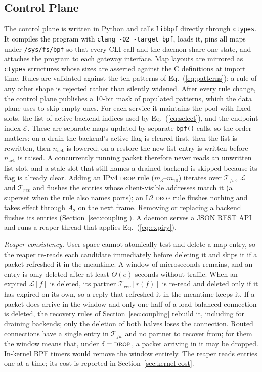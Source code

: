 \documentclass[conference]{IEEEtran}
\begin{document}
\subsection{Control Plane}
The control plane is written in Python and calls \texttt{libbpf} directly
through \texttt{ctypes}. It compiles the program with
\texttt{clang -O2 -target bpf}, loads it, pins all maps under
\texttt{/sys/fs/bpf} so that every CLI call and the daemon share one state,
and attaches the program to each gateway interface. Map layouts are mirrored as
\texttt{ctypes} structures whose sizes are asserted against the C definitions
at import time. Rules are validated against the ten patterns of
Eq.~(\ref{eq:patterns}); a rule of any other shape is rejected rather than
silently widened. After every rule change, the control plane publishes a
10-bit mask of populated patterns, which the data plane uses to skip empty
ones. For each service it maintains the pool with fixed slots, the list of active
backend indices used by Eq.~(\ref{eq:select}), and the endpoint index
$\mathcal{E}$. These are separate maps updated by separate \texttt{bpf()}
calls, so the order matters: on a drain the backend's active flag is cleared
first, then the list is rewritten, then $n_{\mathrm{act}}$ is lowered; on a
restore the new list entry is written before $n_{\mathrm{act}}$ is raised. A
concurrently running packet therefore never reads an unwritten list slot, and
a stale slot that still names a drained backend is skipped because its flag is
already clear. Adding an IPv4 \textsc{drop} rule ($m_3$--$m_{10}$) iterates
over $\mathcal{T}_{fw}$, $\mathcal{L}$ and $\mathcal{T}_{rev}$ and flushes the
entries whose client-visible addresses match it (a superset when the rule also
names ports); an L2 \textsc{drop} rule flushes nothing and takes effect through
$A_2$ on the next frame. Removing or replacing a backend flushes its entries
(Section~\ref{sec:coupling}). A daemon serves a JSON REST API and runs a reaper thread
that applies Eq.~(\ref{eq:expiry}).

\textit{Reaper consistency.}
\label{sec:reaper}
User space cannot atomically test and delete a map entry, so the reaper
re-reads each candidate immediately before deleting it and skips it if a
packet refreshed it in the meantime. A window of microseconds remains, and an
entry is only deleted after at least $\Theta(e)$ seconds without traffic.
When an expired $\mathcal{L}[f]$ is deleted, its partner
$\mathcal{T}_{rev}[r(f)]$ is re-read and deleted only if it has expired on its
own, so a reply that refreshed it in the meantime keeps it. If a packet does
arrive in the window and only one half of a load-balanced connection is
deleted, the recovery rules of Section~\ref{sec:coupling} rebuild it,
including for draining backends; only the deletion of both halves loses the
connection. Routed connections have a single entry in $\mathcal{T}_{fw}$ and
no partner to recover from; for them the window means that, under
$\delta=\textsc{drop}$, a packet arriving in it may be dropped. In-kernel BPF timers would remove the window entirely.
The reaper reads entries one at a time; its cost is reported in
Section~\ref{sec:kernel-cost}.
\end{document}

